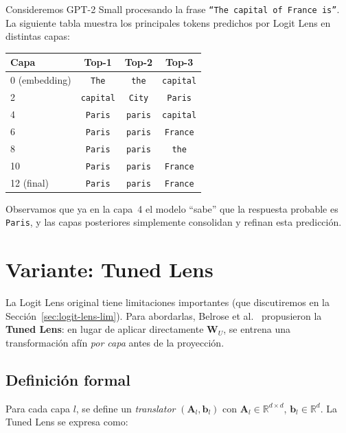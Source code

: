 \documentclass[11pt,a4paper]{report}
\theoremstyle{definition}
\begin{document}
Consideremos GPT-2 Small procesando la frase \texttt{``The capital of France is''}. La siguiente tabla muestra los principales tokens predichos por Logit Lens en distintas capas:

\begin{center}
\begin{tabular}{lccc}
\toprule
\textbf{Capa} & \textbf{Top-1} & \textbf{Top-2} & \textbf{Top-3} \\
\midrule
0 (embedding) & \texttt{The} & \texttt{the} & \texttt{capital} \\
2 & \texttt{capital} & \texttt{City} & \texttt{Paris} \\
4 & \texttt{Paris} & \texttt{paris} & \texttt{capital} \\
6 & \texttt{Paris} & \texttt{paris} & \texttt{France} \\
8 & \texttt{Paris} & \texttt{paris} & \texttt{the} \\
10 & \texttt{Paris} & \texttt{paris} & \texttt{France} \\
12 (final) & \texttt{Paris} & \texttt{paris} & \texttt{France} \\
\bottomrule
\end{tabular}
\end{center}

Observamos que ya en la capa~4 el modelo ``sabe'' que la respuesta probable es \texttt{Paris}, y las capas posteriores simplemente consolidan y refinan esta predicción.

\section{Variante: Tuned Lens}

La Logit Lens original tiene limitaciones importantes (que discutiremos en la Sección~\ref{sec:logit-lens-lim}). Para abordarlas, Belrose et al.~\cite{belrose2023tunedlens} propusieron la \textbf{Tuned Lens}: en lugar de aplicar directamente $\mathbf{W}_U$, se entrena una transformación afín \emph{por capa} antes de la proyección.

\subsection{Definición formal}

Para cada capa $l$, se define un \emph{translator} $(\mathbf{A}_l, \mathbf{b}_l)$ con $\mathbf{A}_l \in \mathbb{R}^{d \times d}$, $\mathbf{b}_l \in \mathbb{R}^{d}$. La Tuned Lens se expresa como:
\end{document}
